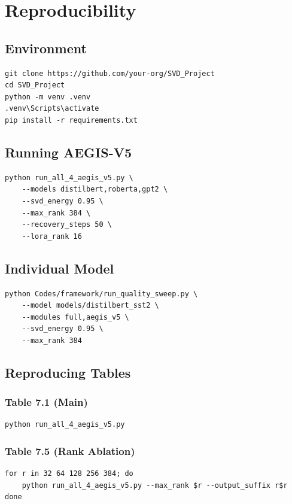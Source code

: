 \section{Reproducibility}

\subsection{Environment}

\begin{lstlisting}
git clone https://github.com/your-org/SVD_Project
cd SVD_Project
python -m venv .venv
.venv\Scripts\activate
pip install -r requirements.txt
\end{lstlisting}

\subsection{Running AEGIS-V5}

\begin{lstlisting}
python run_all_4_aegis_v5.py \
    --models distilbert,roberta,gpt2 \
    --svd_energy 0.95 \
    --max_rank 384 \
    --recovery_steps 50 \
    --lora_rank 16
\end{lstlisting}

\subsection{Individual Model}

\begin{lstlisting}
python Codes/framework/run_quality_sweep.py \
    --model models/distilbert_sst2 \
    --modules full,aegis_v5 \
    --svd_energy 0.95 \
    --max_rank 384
\end{lstlisting}

\subsection{Reproducing Tables}

\subsubsection{Table 7.1 (Main)}
\begin{lstlisting}
python run_all_4_aegis_v5.py
\end{lstlisting}

\subsubsection{Table 7.5 (Rank Ablation)}
\begin{lstlisting}
for r in 32 64 128 256 384; do
    python run_all_4_aegis_v5.py --max_rank $r --output_suffix r$r
done
\end{lstlisting}

